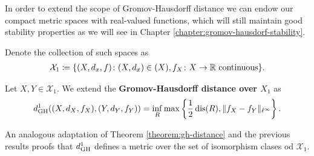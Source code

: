 In order to extend the scope of Gromov-Hausdorff distance we can endow our compact metric spaces with real-valued functions, which will still maintain good stability properties as we will see in Chapter \ref{chapter:gromov-hausdorf-stability}.

Denote the collection of such spaces as
\begin{align}
    \mathcal{X}_1 \coloneq \{ (X, d_x, f) \colon (X, d_x) \in \mathcal(X), f_X \colon X \to \mathbb R \text{ continuous}\}.
\end{align}

\begin{definition} \label{def:dgh1}
    Let $ X, Y \in \mathcal{X}_1 $. We extend the {\bf Gromov-Hausdorff distance over $ X_1 $} as
    \begin{equation}
        d_{\operatorname{GH}}^1((X, d_X, f_X), (Y, d_Y, f_Y)) = \inf_{R} \max \left\{ \frac{1}{2} \operatorname{dis}(R), \|f_X - f_Y \|_{\ell^\infty} \right\}.   
    \end{equation}
\end{definition}

An analogous adaptation of Theorem \ref{theorem:gh-distance} and the previous results proofs that $ d_{\operatorname{GH}}^1 $ defines a metric over the set of isomorphism clases od $ \mathcal{X}_1 $.